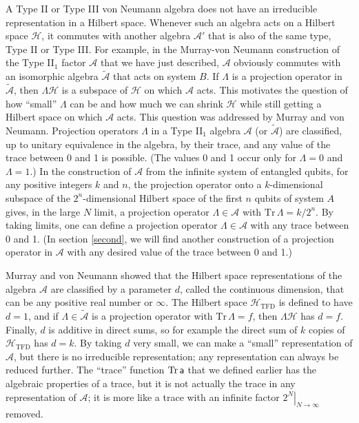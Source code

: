 \documentclass[11pt,a4paper]{article}
\def\t{{ \sf t}}
\def\a{{\sf a}}
\def\A{{\mathcal A}}
\def\t{\widetilde }
\def\H{{\mathcal H}}
\def\Tr{{\mathrm{Tr}}}
\def\TFD{{\mathrm{TFD}}}
\begin{document}
A Type II or Type III von Neumann algebra does not have an irreducible representation in a Hilbert space.   Whenever such an algebra acts on a Hilbert space $\H$,
it commutes with another algebra $\A'$ that is also of the same type, Type II or Type III.   For example, in the Murray-von Neumann construction of the Type II$_1$
factor $\A$ that we have just described, $\A$ obviously commutes with an isomorphic algebra $\t\A$ that acts on system $B$.   If $\Lambda$ is a projection operator
in $\t\A$, then $\Lambda\H$ is a subspace of $\H$ on which $\A$ acts.   This motivates the question of how ``small'' $\Lambda$ can be and how much we can shrink
$\H$ while still getting a Hilbert space on which $\A$ acts.  This question was addressed by Murray and von Neumann.   Projection operators $\Lambda$
in a Type II$_1$ algebra $\A$ (or $\t\A$) 
are classified, up to unitary equivalence in the algebra, by their trace, and any value of the trace between 0 and 1 is possible.   (The values 0 and 1 occur
only for $\Lambda=0$ and $\Lambda=1$.)   In the construction of $\A$ from the infinite system of entangled qubits, for any positive integers $k$ and $n$, 
the projection operator
onto a $k$-dimensional subspace of the $2^n$-dimensional Hilbert space of the first $n$ qubits of system $A$ gives, in the large $N$ limit, 
a projection operator  $\Lambda\in \A$ with $\Tr\,\Lambda=k/2^n$.   By taking limits, one can define a projection operator $\Lambda\in\A$ with any trace between 0 and 1.
(In section \ref{second}, we will find another construction of a projection operator in $\A$ with any desired value of the trace between 0 and 1.)   

Murray and von Neumann showed that the Hilbert space representations of the algebra $\A$ are classified by a parameter $d$, called the continuous dimension,
that can be any positive real number or $\infty$.   The Hilbert space $\H_\TFD$ is defined to have $d=1$, and if $\Lambda\in \t\A$ is a projection operator
with $\Tr\,\Lambda=f$, then $\Lambda\H$ has $d=f$.   Finally, $d$ is additive in direct sums, so for example the direct sum of $k$ copies of $\H_\TFD$ has
$d=k$.   By taking $d$ very small, we can make a ``small'' representation of $\A$, but there is no irreducible representation; any representation can always
be reduced further.   The ``trace'' function $\Tr\,\a$ that we defined earlier has the algebraic properties of a trace, but it is not actually the trace in any representation
of $\A$; it is more like a trace with an infinite factor $\left.2^{N}\right|_{N\to\infty}$ removed.
\end{document}
